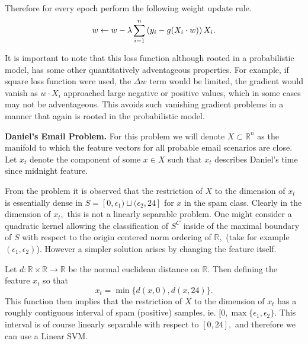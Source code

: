 \documentclass[letter]{article}
\newenvironment{menumerate}{%
  \edef\backupindent{\the\parindent}%
  \enumerate%
  \setlength{\parindent}{\backupindent}%
}{\endenumerate}
\begin{document}
\begin{menumerate}
\begin{menumerate}
  Therefore for every epoch perform the following weight update rule.
  \begin{equation}
    w \leftarrow w - \lambda \sum_{i=1}^n  \left(y_i  - g(X_i \cdot w)\right)X_i. \\ 
  \end{equation}

  It is important to note that this loss function although rooted in a probabilistic model, has some other quantitatively adventageous properties. For example, if square loss function were used, the $\Delta w$ term would be limited, the gradient would vanish as $w\cdot X_i$ approached large negative or positive values, which in some cases may not be adventageous. This avoids such vanishing gradient problems in a manner that again is rooted in the probabilistic model.
  \end{menumerate}
  \item \textbf{Daniel's Email Problem.} For this problem we will denote $X \subset \mathbb{R}^n$ as the manifold 
  to which the feature vectors for all probable email scenarios are close. Let $x_t$ denote the component of some $x \in X$ such that $x_t$ describes
  Daniel's time since midnight feature. 

  From the problem it is observed that the restriction of $X$ to the dimension of $x_t$ is essentially dense in $S = [0, \epsilon_1) \sqcup (\epsilon_2, 24]$ for $x $ in the spam class. Clearly in the dimension of $x_t,$ this is not a linearly separable problem. One might consider a quadratic kernel allowing the classification of $S^C$ inside of the maximal boundary of $S$ with respect to the origin centered norm ordering of $\mathbb{R}, $ (take for example $(\epsilon_1, \epsilon_2)$). However a simpler solution arises by changing the feature itself.

  Let $d: \mathbb{R} \times \mathbb{R} \to \mathbb{R}$ be the normal euclidean distance on $\mathbb{R}.$ Then defining the feature $x_t$
  so that
  \begin{equation}
  	x_t = \min\{d(x,0), d(x,24)\}.
  \end{equation}
  This function then implies that the restriction of $X$ to the dimension of $x_t$ has a roughly contiguous interval of spam (positive) samples, ie. $[0, \max\{\epsilon_1, \epsilon_2\}.$ This interval is of course linearly separable with respect to $[0,24],$ and therefore we can use a Linear SVM.
\end{menumerate}
\end{document}
